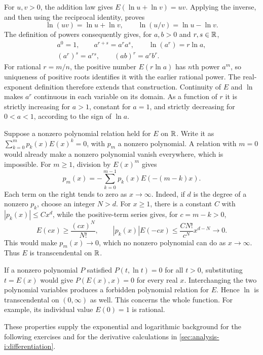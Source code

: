 For $u,v>0$, the addition law gives
$E(\ln u+\ln v)=uv$. Applying the inverse, and then using the
reciprocal identity, proves
\[
  \ln(uv)=\ln u+\ln v,\qquad
  \ln(u/v)=\ln u-\ln v.
\]
The definition of powers consequently gives, for $a,b>0$ and
$r,s\in\mathbb{R}$,
\[
  \begin{gathered}
    a^0=1,\qquad a^{r+s}=a^ra^s,\qquad
    \ln(a^r)=r\ln a,\\
    (a^r)^s=a^{rs},\qquad (ab)^r=a^rb^r.
  \end{gathered}
\]
For rational $r=m/n$, the positive number $E(r\ln a)$ has $n$th
power $a^m$, so uniqueness of positive roots identifies it with the
earlier rational power. The real-exponent definition therefore extends
that construction. Continuity of $E$ and $\ln$ makes $a^r$ continuous
in each variable on its domain. As a function of $r$ it is strictly
increasing for $a>1$, constant for $a=1$, and strictly decreasing for
$0<a<1$, according to the sign of $\ln a$.

\begin{example}
  Suppose a nonzero polynomial relation held for $E$ on $\mathbb{R}$. Write it
  as $\sum_{k=0}^{m}p_k(x)E(x)^k=0$, with $p_m$ a nonzero polynomial.
  A relation with $m=0$ would already make a nonzero polynomial vanish
  everywhere, which is impossible. For $m\ge1$, division by $E(x)^m$
  gives
  \[
    p_m(x)=-\sum_{k=0}^{m-1}p_k(x)E(-(m-k)x).
  \]
  Each term on the right tends to zero as $x\to\infty$. Indeed, if
  $d$ is the degree of a nonzero $p_k$, choose an integer $N>d$.
  For $x\ge1$, there is a constant $C$ with $|p_k(x)|\le Cx^d$,
  while the positive-term series gives, for $c=m-k>0$,
  \[
    E(cx)\ge\frac{(cx)^N}{N!},\qquad
    |p_k(x)|E(-cx)\le\frac{CN!}{c^N}x^{d-N}\longrightarrow0.
  \]
  This would make $p_m(x)\to0$, which no nonzero polynomial can do
  as $x\to\infty$. Thus $E$ is transcendental on $\mathbb{R}$.

  If a nonzero polynomial $P$ satisfied $P(t,\ln t)=0$ for all $t>0$,
  substituting $t=E(x)$ would give $P(E(x),x)=0$ for every real $x$.
  Interchanging the two polynomial variables produces a forbidden
  polynomial relation for $E$. Hence $\ln$ is transcendental on
  $(0,\infty)$ as well. This concerns the whole function. For example,
  its individual value $E(0)=1$ is rational.
\end{example}

These properties supply the exponential and logarithmic background for
the following exercises and for the derivative calculations in
\autoref{sec:analysis-i:differentiation}.

